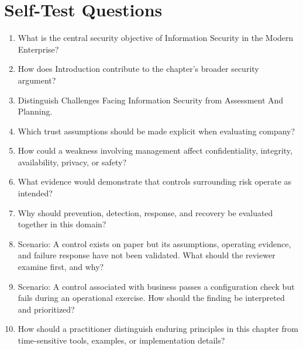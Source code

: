 \documentclass[11pt,letterpaper]{article}
\begin{document}
\section*{Self-Test Questions}
\begin{enumerate}
\item What is the central security objective of Information Security in the Modern Enterprise?
\item How does Introduction contribute to the chapter's broader security argument?
\item Distinguish Challenges Facing Information Security from Assessment And Planning.
\item Which trust assumptions should be made explicit when evaluating company?
\item How could a weakness involving management affect confidentiality, integrity, availability, privacy, or safety?
\item What evidence would demonstrate that controls surrounding risk operate as intended?
\item Why should prevention, detection, response, and recovery be evaluated together in this domain?
\item Scenario: A control exists on paper but its assumptions, operating evidence, and failure response have not been validated. What should the reviewer examine first, and why?
\item Scenario: A control associated with business passes a configuration check but fails during an operational exercise. How should the finding be interpreted and prioritized?
\item How should a practitioner distinguish enduring principles in this chapter from time-sensitive tools, examples, or implementation details?
\end{enumerate}
\end{document}
